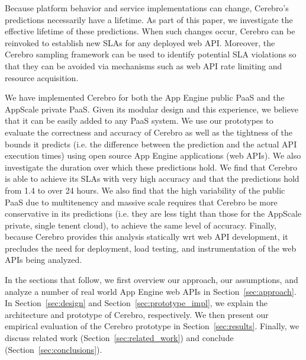 Because platform behavior and service implementations can change,
Cerebro's predictions necessarily have a lifetime.  
As part of this paper, we investigate
the effective lifetime of these predictions.  When such changes occur,
Cerebro can be reinvoked to establish new SLAs for any deployed web API.  Moreover,
the Cerebro sampling framework can be used to identify potential SLA violations
so that they can be avoided via mechanisms such 
as web API rate limiting and resource acquisition.


We have implemented Cerebro for both the App Engine public PaaS and 
the AppScale private PaaS. Given its modular design and this experience, 
we believe that it can be easily added to any PaaS system.
We use our prototypes to evaluate the correctness and accuracy of Cerebro 
as well as the tightness
of the bounds it predicts (i.e. the difference between the prediction and 
the actual API execution times) using open source App Engine applications (web APIs).  
We also investigate the duration over which 
these predictions hold.  We find that Cerebro is able to achieve its SLAs with 
very high accuracy and that the predictions hold from 1.4 to over 24 hours.  
We also find that the high variability of the public PaaS due to multitenency
and massive scale requires that Cerebro be more conservative in its predictions
(i.e. they are less tight than those for the AppScale private, single tenent cloud), 
to achieve the same level of accuracy.  Finally, because Cerebro provides this 
analysis statically wrt web API development, 
it precludes the need for deployment, load testing, and
instrumentation of the web APIs being analyzed.

In the sections that follow, we first overview our approach, our assumptions,
and analyze a number of real world App Engine web APIs
in Section~\ref{sec:approach}.   
In Section~\ref{sec:design}
and Section~\ref{sec:prototype_impl}, we explain the architecture and 
prototype of Cerebro, respectively.  We then 
present our empirical evaluation of the Cerebro prototype in 
Section~\ref{sec:results}.
Finally,  we discuss related work (Section~\ref{sec:related_work}) and 
conclude (Section~\ref{sec:conclusions}).


